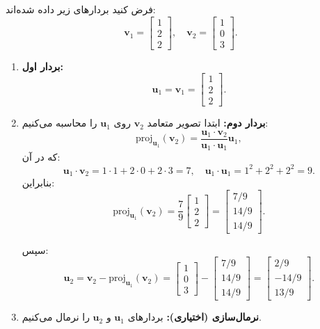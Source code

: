 \begin{example}
	فرض کنید بردارهای زیر داده شده‌اند:
	\[
	\mathbf{v}_1 = \begin{bmatrix} 1 \\ 2 \\ 2 \end{bmatrix}, \quad \mathbf{v}_2 = \begin{bmatrix} 1 \\ 0 \\ 3 \end{bmatrix}.
	\]
	
	\begin{enumerate}
		\item \textbf{بردار اول:}
		\[
		\mathbf{u}_1 = \mathbf{v}_1 = \begin{bmatrix} 1 \\ 2 \\ 2 \end{bmatrix}.
		\]
		
		\item \textbf{بردار دوم:}
		ابتدا تصویر متعامد \( \mathbf{v}_2 \) روی \( \mathbf{u}_1 \) را محاسبه می‌کنیم:
		\[
		\text{proj}_{\mathbf{u}_1}(\mathbf{v}_2) = \frac{\mathbf{u}_1 \cdot \mathbf{v}_2}{\mathbf{u}_1 \cdot \mathbf{u}_1} \mathbf{u}_1,
		\]
		که در آن:
		\[
		\mathbf{u}_1 \cdot \mathbf{v}_2 = 1 \cdot 1 + 2 \cdot 0 + 2 \cdot 3 = 7, \quad \mathbf{u}_1 \cdot \mathbf{u}_1 = 1^2 + 2^2 + 2^2 = 9.
		\]
		بنابراین:
		\[
		\text{proj}_{\mathbf{u}_1}(\mathbf{v}_2) = \frac{7}{9} \begin{bmatrix} 1 \\ 2 \\ 2 \end{bmatrix} = \begin{bmatrix} 7/9 \\ 14/9 \\ 14/9 \end{bmatrix}.
		\]
		
		سپس:
		\[
		\mathbf{u}_2 = \mathbf{v}_2 - \text{proj}_{\mathbf{u}_1}(\mathbf{v}_2) = \begin{bmatrix} 1 \\ 0 \\ 3 \end{bmatrix} - \begin{bmatrix} 7/9 \\ 14/9 \\ 14/9 \end{bmatrix} = \begin{bmatrix} 2/9 \\ -14/9 \\ 13/9 \end{bmatrix}.
		\]
		
		\item \textbf{نرمال‌سازی (اختیاری):}
		بردارهای \( \mathbf{u}_1 \) و \( \mathbf{u}_2 \) را نرمال می‌کنیم.
	\end{enumerate}
\end{example}
